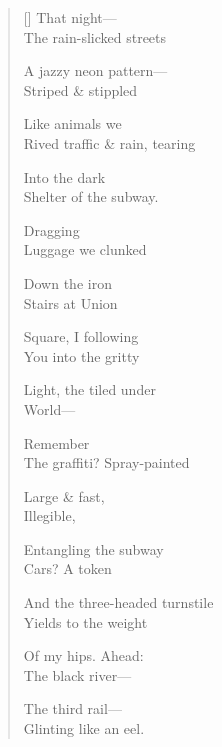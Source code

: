 \label{ch:leaving_new_york}
\begin{verse}[\versewidth]
That night---\\
The rain-slicked streets

A jazzy neon pattern---\\
Striped \& stippled

Like animals we\\
Rived traffic \& rain, tearing

Into the dark\\
Shelter of the subway.

\hspace*{4\vgap} Dragging\\
Luggage we clunked

Down the iron\\
Stairs at Union

Square, I following\\
You into the gritty

Light, the tiled under\\
World---

Remember\\
The graffiti?     Spray-painted

Large \& fast,\\
Illegible,

Entangling the subway\\
Cars?   A token

And the three-headed turnstile\\
Yields to the weight

Of my hips. Ahead:\\
The black river---

The third rail---\\
Glinting like an eel.
\end{verse}
